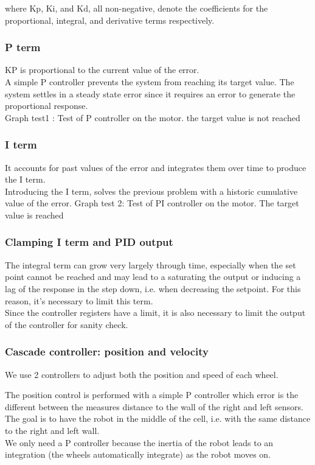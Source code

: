 where Kp, Ki, and Kd, all non-negative, denote the coefficients for the proportional, integral, and derivative terms respectively.

\subsubsection*{P term}

KP is proportional to the current value of the error. \\
A simple P controller prevents the system from reaching its target value. The system settles in a steady state error since it requires an error to generate the proportional response.\\
Graph test1 : Test of P controller on the motor. the target value is not reached
\subsubsection{I term}

It accounts for past values of the error and integrates them over time to produce the I term. \\
Introducing the I term, solves the previous problem with a historic cumulative value of the error.
Graph test 2: Test of PI controller on the motor. The target value is reached

\subsubsection{Clamping I term and PID output}

The integral term can grow very largely through time, especially when the set point cannot be reached and may lead to a saturating the output or inducing a lag of the response in the step down, i.e. when decreasing the setpoint. For this reason, it’s necessary to limit this term.\\
Since the controller registers have a limit, it is also necessary to limit the output of the controller for sanity check. 

\subsubsection{Cascade controller: position and velocity}

We use 2 controllers to adjust both the position and speed of each wheel. 

The position control is performed with a simple P controller which error is the different between the measures distance to the wall of the right and left sensors. The goal is to have the robot in the middle of the cell, i.e. with the same distance to the right and left wall.\\
We only need a P controller because the inertia of the robot leads to an integration (the wheels automatically integrate) as the robot moves on.

